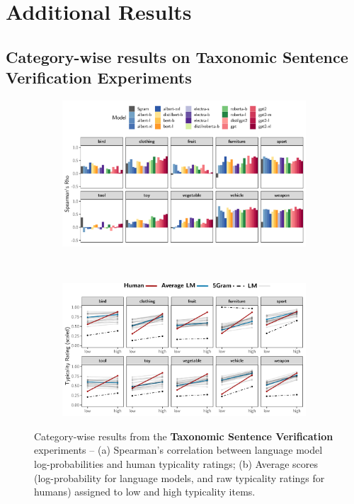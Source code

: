 \documentclass[a4paper, 11pt]{article}
\begin{document}
\section{Additional Results}
\subsection{Category-wise results on Taxonomic Sentence Verification Experiments}

\begin{figure}[h]
    \centering
    \begin{subfigure}[b]{\textwidth}
        \includegraphics[width = \textwidth]{../paper/tsv_categorywise.pdf}
        \caption{}
    \end{subfigure}\\
    \vspace{1em}
    \begin{subfigure}[b]{\textwidth}
        \includegraphics[width = \textwidth]{../paper/categorywisetsv.pdf}
        \caption{}
    \end{subfigure}
    \caption{Category-wise results from the \textbf{Taxonomic Sentence Verification} experiments -- (a) Spearman's correlation between language model log-probabilities and human typicality ratings; (b) Average scores (log-probability for language models, and raw typicality ratings for humans) assigned to low and high typicality items.}
\end{figure}
\end{document}
